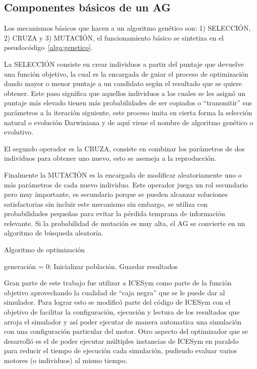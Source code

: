 \subsection{Componentes básicos de un AG}
%
Los mecanismos básicos que hacen a un algoritmo genético son: 1) SELECCIÓN,
2) CRUZA y 3) MUTACIÓN, el funcionamiento básico se sintetiza en el
pseudocódigo~\ref{algo:genetico}.

La SELECCIÓN consiste en crear individuos a partir del puntaje que devuelve
una función objetivo, la cual es la encargada de guiar el proceso de
optimización dando mayor o menor puntaje a un candidato según el resultado que
se quiere obtener.
%
Este paso significa que aquellos individuos a los cuales se les asignó un
puntaje más elevado tienen más probabilidades de ser copiados o ``transmitir''
sus parámetros a la iteración siguiente, este proceso imita en cierta forma la
selección natural o evolución Darwiniana y de aquí viene el nombre de algoritmo
genético o evolutivo.

El segundo operador es la CRUZA, consiste en combinar los parámetros de dos
individuos para obtener uno nuevo, esto se asemeja a la reproducción.

Finalmente la MUTACIÓN es la encargada de modificar aleatoriamente uno o más
parámetros de cada nuevo individuo.
%
Este operador juega un rol secundario pero muy importante, es secundario porque
se pueden alcanzar soluciones satisfactorias sin incluir este mecanismo sin
embargo, se utiliza con probabilidades pequeñas para evitar la pérdida temprana
de información relevante.
%
Si la probabilidad de mutación es muy alta, el AG se convierte en un algoritmo
de búsqueda aleatoria.


\begin{algorithm} \caption{Algoritmo de optimización}\label{algo:genetico}
  generación = 0;
  Inicializar población.\;
  {Guardar resultados\;}
\end{algorithm}

%
%
Gran parte de este trabajo fue utilizar a ICESym como parte de la función
objetivo aprovechando la cualidad de ``caja negra'' que se le puede dar al
simulador.
%
Para lograr esto se modificó parte del código de ICESym con el objetivo de
facilitar la configuración, ejecución y lectura de los resultados que arroja el
simulador y así poder ejecutar de manera automatica una simulación con una
configuración particular del motor.
%
Otro aspecto del optimizador que se desarrolló es el de poder ejecutar múltiples
instancias de ICESym en paralelo para reducir el tiempo de ejecución cada
simulación, pudiendo evaluar varios motores (o individuos) al mismo tiempo.

